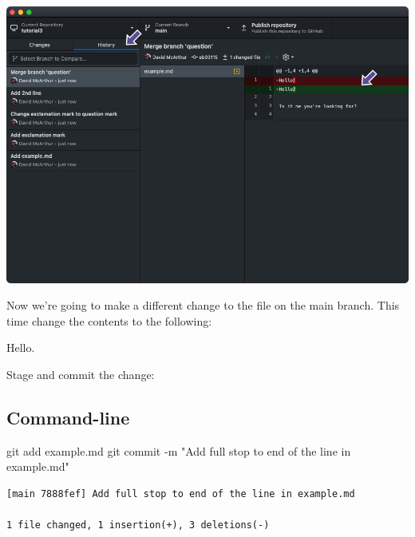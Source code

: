 \documentclass[
  letterpaper,
  DIV=11,
  numbers=noendperiod]{scrartcl}
\newenvironment{Shaded}{\begin{snugshade}}{\end{snugshade}}
\newcommand{\AttributeTok}[1]{\textcolor[rgb]{0.40,0.45,0.13}{#1}}
\newcommand{\FunctionTok}[1]{\textcolor[rgb]{0.28,0.35,0.67}{#1}}
\newcommand{\NormalTok}[1]{\textcolor[rgb]{0.00,0.23,0.31}{#1}}
\newcommand{\StringTok}[1]{\textcolor[rgb]{0.13,0.47,0.30}{#1}}
\begin{document}
\includegraphics{images/image49.png}

Now we're going to make a different change to the file on the main
branch. This time change the contents to the following:

\begin{tcolorbox}[enhanced jigsaw, rightrule=.15mm, opacitybacktitle=0.6, bottomtitle=1mm, colbacktitle=quarto-callout-note-color!10!white, toprule=.15mm, title=\textcolor{quarto-callout-note-color}{\faInfo}\hspace{0.5em}{example.md}, toptitle=1mm, left=2mm, leftrule=.75mm, titlerule=0mm, bottomrule=.15mm, colframe=quarto-callout-note-color-frame, arc=.35mm, coltitle=black, breakable, colback=white, opacityback=0]

Hello.

\end{tcolorbox}

Stage and commit the change:

\subsection{Command-line}

\begin{Shaded}
\begin{Highlighting}[]
\FunctionTok{git}\NormalTok{ add example.md}
\FunctionTok{git}\NormalTok{ commit }\AttributeTok{{-}m} \StringTok{"Add full stop to end of the line in example.md"}
\end{Highlighting}
\end{Shaded}

\begin{verbatim}
[main 7888fef] Add full stop to end of the line in example.md

1 file changed, 1 insertion(+), 3 deletions(-)
\end{verbatim}
\end{document}
